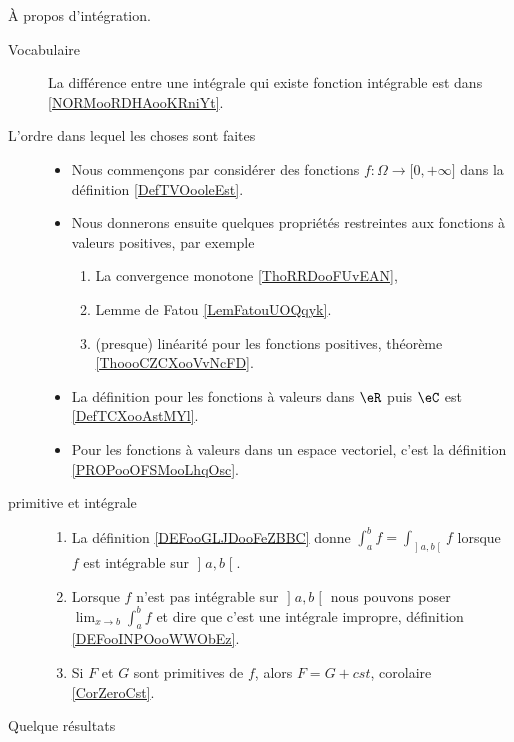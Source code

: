      \label{THEMEooHINHooJaSYQW}

À propos d'intégration.
\begin{description}
	\item[Vocabulaire] La différence entre une intégrale qui existe fonction intégrable est dans \ref{NORMooRDHAooKRniYt}.
	\item[L'ordre dans lequel les choses sont faites]
		\begin{itemize}
			\item
			      Nous commençons par considérer des fonctions \( f\colon \Omega\to \mathopen[ 0 , +\infty \mathclose]\) dans la définition \ref{DefTVOooleEst}.
			\item
			      Nous donnerons ensuite quelques propriétés restreintes aux fonctions à valeurs positives, par exemple
			      \begin{enumerate}
				      \item
				            La convergence monotone \ref{ThoRRDooFUvEAN},
				      \item
				            Lemme de Fatou \ref{LemFatouUOQqyk}.
				      \item
				            (presque) linéarité pour les fonctions positives, théorème \ref{ThoooCZCXooVvNcFD}.
			      \end{enumerate}
			\item
			      La définition pour les fonctions à valeurs dans \( \eR\) puis \( \eC\) est \ref{DefTCXooAstMYl}.
			\item
			      Pour les fonctions à valeurs dans un espace vectoriel, c'est la définition \ref{PROPooOFSMooLhqOsc}.
		\end{itemize}
	\item[primitive et intégrale]
		\begin{enumerate}
			\item
			      La définition \ref{DEFooGLJDooFeZBBC} donne \( \int_a^bf=\int_{\mathopen] a ,b \mathclose[}f\) lorsque \( f\) est intégrable sur \( \mathopen] a , b \mathclose[\).
			\item Lorsque \( f\) n'est pas intégrable sur \( \mathopen] a , b \mathclose[\) nous pouvons poser \( \lim_{x\to b} \int_a^bf\) et dire que c'est une intégrale impropre, définition \ref{DEFooINPOooWWObEz}.
			\item
			      Si \( F\) et \( G\) sont primitives de \( f\), alors \( F=G+cst\), corolaire \ref{CorZeroCst}.
		\end{enumerate}
	\item[Quelque résultats]

\end{description}
